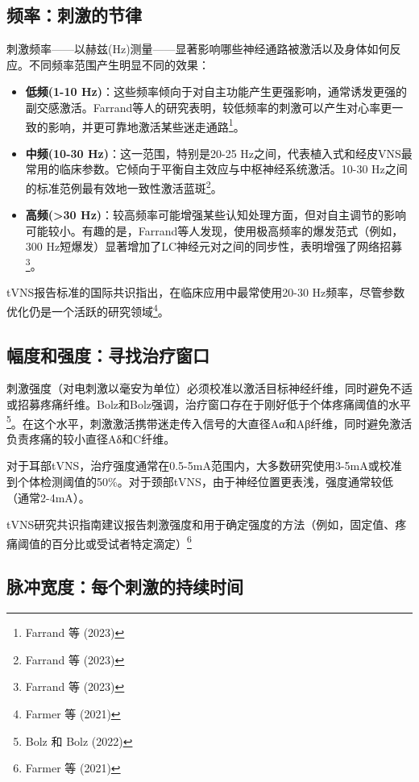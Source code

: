 \documentclass[
  Letterpaper,
]{scrbook}
\begin{document}
\subsection{频率：刺激的节律}\label{ux9891ux7387ux523aux6fc0ux7684ux8282ux5f8b}

刺激频率------以赫兹(Hz)测量------显著影响哪些神经通路被激活以及身体如何反应。不同频率范围产生明显不同的效果：

\begin{itemize}
\item
  \textbf{低频(1-10
  Hz)}：这些频率倾向于对自主功能产生更强影响，通常诱发更强的副交感激活。Farrand等人的研究表明，较低频率的刺激可以产生对心率更一致的影响，并更可靠地激活某些迷走通路\footnote{Farrand
    等 (2023)}。
\item
  \textbf{中频(10-30 Hz)}：这一范围，特别是20-25
  Hz之间，代表植入式和经皮VNS最常用的临床参数。它倾向于平衡自主效应与中枢神经系统激活。10-30
  Hz之间的标准范例最有效地一致性激活蓝斑\footnote{Farrand 等 (2023)}。
\item
  \textbf{高频(\textgreater30
  Hz)}：较高频率可能增强某些认知处理方面，但对自主调节的影响可能较小。有趣的是，Farrand等人发现，使用极高频率的爆发范式（例如，300
  Hz短爆发）显著增加了LC神经元对之间的同步性，表明增强了网络招募\footnote{Farrand
    等 (2023)}。
\end{itemize}

tVNS报告标准的国际共识指出，在临床应用中最常使用20-30
Hz频率，尽管参数优化仍是一个活跃的研究领域\footnote{Farmer 等 (2021)}。

\subsection{幅度和强度：寻找治疗窗口}\label{ux5e45ux5ea6ux548cux5f3aux5ea6ux5bfbux627eux6cbbux7597ux7a97ux53e3}

刺激强度（对电刺激以毫安为单位）必须校准以激活目标神经纤维，同时避免不适或招募疼痛纤维。Bolz和Bolz强调，治疗窗口存在于刚好低于个体疼痛阈值的水平\footnote{Bolz
  和 Bolz (2022)}。在这个水平，刺激激活携带迷走传入信号的大直径Aα和Aβ纤维，同时避免激活负责疼痛的较小直径Aδ和C纤维。

对于耳部tVNS，治疗强度通常在0.5-5mA范围内，大多数研究使用3-5mA或校准到个体检测阈值的50\%。对于颈部tVNS，由于神经位置更表浅，强度通常较低（通常2-4mA）。

tVNS研究共识指南建议报告刺激强度和用于确定强度的方法（例如，固定值、疼痛阈值的百分比或受试者特定滴定）\footnote{Farmer
  等 (2021)}

\subsection{脉冲宽度：每个刺激的持续时间}\label{ux8109ux51b2ux5bbdux5ea6ux6bcfux4e2aux523aux6fc0ux7684ux6301ux7eedux65f6ux95f4}
\end{document}
